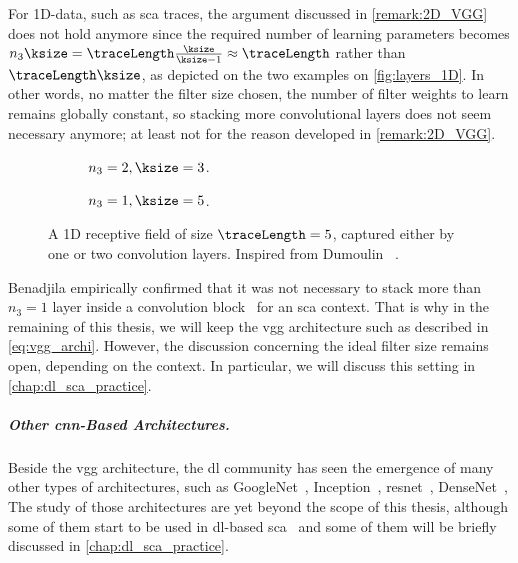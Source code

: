 For 1D-data, such as \gls{sca} traces, the argument discussed in \autoref{remark:2D_VGG} does not hold anymore since the required number of learning parameters becomes \(n_3 \ksize = \traceLength \frac{\ksize}{\ksize-1} \approx \traceLength\) rather than \(\traceLength \ksize\), as depicted on the two examples on \autoref{fig:layers_1D}.
In other words, no matter the filter size chosen, the number of filter weights to learn remains globally constant, so stacking more convolutional layers does not seem necessary anymore; at least not for the reason developed in \autoref{remark:2D_VGG}.
\begin{figure}[h]
	\centering
	\begin{subfigure}{0.49 \textwidth}
		\centering
		
		\caption{\(n_3 = 2, \ksize=3\).}
	\end{subfigure}
	\begin{subfigure}{0.49 \textwidth}
		\centering
		
		\caption{\(n_3 = 1, \ksize=5\).}
	\end{subfigure}
	\caption{A 1D receptive field of size \(\traceLength=5\), captured either by one or two convolution layers.
	Inspired from Dumoulin \etal{}~\cite{dumoulin_guide_2016}.}
	\label{fig:layers_1D}
\end{figure}
Benadjila \etal{} empirically confirmed that it was not necessary to stack more than \(n_3=1\) layer inside a convolution block~\cite{prouff_study_2018} for an \gls{sca} context.
That is why in the remaining of this thesis, we will keep the \gls{vgg} architecture such as described in \autoref{eq:vgg_archi}.
However, the discussion concerning the ideal filter size remains open, depending on the context.
In particular, we will discuss this setting in \autoref{chap:dl_sca_practice}.


\subparagraph{Other \gls{cnn}-Based Architectures.}
\label{sec:other_archi}
Beside the \gls{vgg} architecture, the \gls{dl} community has seen the emergence of many other types of architectures, such as GoogleNet~\cite{szegedy_deeper_2015}, Inception~\cite{szegedy_inception_2015}, \gls{resnet}~\cite{he_deep_2015}, DenseNet~\cite{huang_densely_2016}, \etc{}
The study of those architectures are yet beyond the scope of this thesis, although some of them start to be used in \gls{dl}-based \gls{sca}~\cite{zhou_deep_2019,gohr_efficient_2020} and some of them will be briefly discussed in \autoref{chap:dl_sca_practice}.